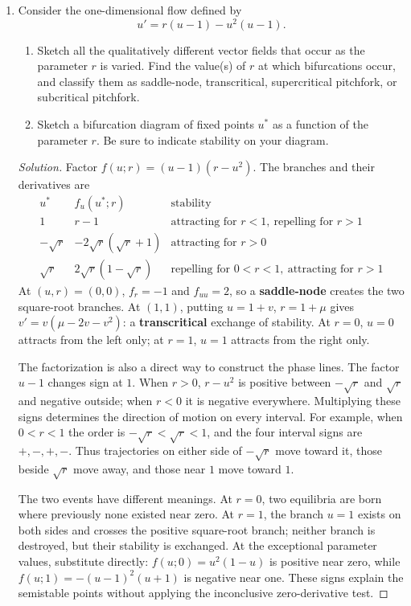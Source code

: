 \documentclass[10pt]{amsart}
\newenvironment{solution}
{\begin{proof}[Solution]}
{\end{proof}}
\begin{document}
\begin{enumerate}[label=\arabic*), leftmargin=*, itemsep=1em]
    \item Consider the one-dimensional flow defined by
    \[
        u' = r(u-1) - u^2(u-1).
    \]
    \begin{enumerate}[label=(\alph*)]
        \item Sketch all the qualitatively different vector fields that occur as the parameter $r$ is varied. Find the value(s) of $r$ at which bifurcations occur, and classify them as saddle-node, transcritical, supercritical pitchfork, or subcritical pitchfork.
        \item Sketch a bifurcation diagram of fixed points $u^*$ as a function of the parameter $r$. Be sure to indicate stability on your diagram.
    \end{enumerate}

    \begin{solution}

Factor $f(u;r)=(u-1)(r-u^2)$. The branches and their derivatives are
\[
\begin{array}{c|c|c}
 u^*&f_u(u^*;r)&\text{stability}\\\hline
 1&r-1&\text{attracting for }r<1,\ \text{repelling for }r>1\\
 -\sqrt r&-2\sqrt r(\sqrt r+1)&\text{attracting for }r>0\\
 \sqrt r&2\sqrt r(1-\sqrt r)&\text{repelling for }0<r<1,\ \text{attracting for }r>1
\end{array}
\]
At $(u,r)=(0,0)$, $f_r=-1$ and $f_{uu}=2$, so a \textbf{saddle-node} creates the two square-root branches. At $(1,1)$, putting $u=1+v$, $r=1+\mu$ gives $v'=v(\mu-2v-v^2)$: a \textbf{transcritical} exchange of stability. At $r=0$, $u=0$ attracts from the left only; at $r=1$, $u=1$ attracts from the right only.

The factorization is also a direct way to construct the phase lines. The factor $u-1$ changes sign at $1$. When $r>0$, $r-u^2$ is positive between $-\sqrt r$ and $\sqrt r$ and negative outside; when $r<0$ it is negative everywhere. Multiplying these signs determines the direction of motion on every interval. For example, when $0<r<1$ the order is $-\sqrt r<\sqrt r<1$, and the four interval signs are $+,-,+,-$. Thus trajectories on either side of $-\sqrt r$ move toward it, those beside $\sqrt r$ move away, and those near $1$ move toward $1$.

The two events have different meanings. At $r=0$, two equilibria are born where previously none existed near zero. At $r=1$, the branch $u=1$ exists on both sides and crosses the positive square-root branch; neither branch is destroyed, but their stability is exchanged. At the exceptional parameter values, substitute directly: $f(u;0)=u^2(1-u)$ is positive near zero, while $f(u;1)=-(u-1)^2(u+1)$ is negative near one. These signs explain the semistable points without applying the inconclusive zero-derivative test.


\end{solution}
\end{enumerate}
\end{document}
